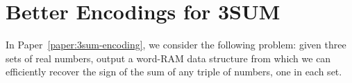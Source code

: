 \section{Better Encodings for 3SUM}







In Paper~\ref{paper:3sum-encoding},
we consider the following problem: given three sets of real numbers, output a
word-RAM data structure from which we can efficiently recover the sign of the
sum of any triple of numbers, one in each set.

